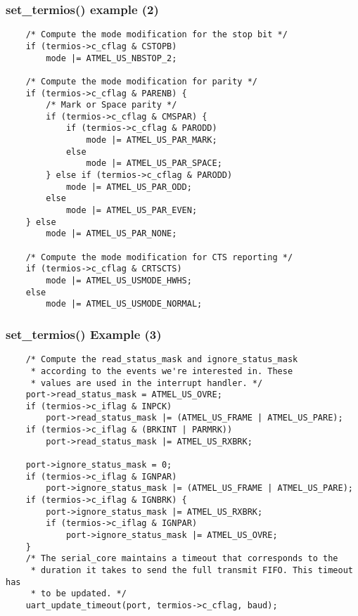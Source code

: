 \begin{frame}[fragile]
  \frametitle{set\_termios() example (2)}
\begin{verbatim}
    /* Compute the mode modification for the stop bit */
    if (termios->c_cflag & CSTOPB)
        mode |= ATMEL_US_NBSTOP_2;

    /* Compute the mode modification for parity */
    if (termios->c_cflag & PARENB) {
        /* Mark or Space parity */
        if (termios->c_cflag & CMSPAR) {
            if (termios->c_cflag & PARODD)
                mode |= ATMEL_US_PAR_MARK;
            else
                mode |= ATMEL_US_PAR_SPACE;
        } else if (termios->c_cflag & PARODD)
            mode |= ATMEL_US_PAR_ODD;
        else
            mode |= ATMEL_US_PAR_EVEN;
    } else
        mode |= ATMEL_US_PAR_NONE;

    /* Compute the mode modification for CTS reporting */
    if (termios->c_cflag & CRTSCTS)
        mode |= ATMEL_US_USMODE_HWHS;
    else
        mode |= ATMEL_US_USMODE_NORMAL;
\end{verbatim}
\end{frame}

\begin{frame}[fragile]
  \frametitle{set\_termios() Example (3)}
\begin{verbatim}
    /* Compute the read_status_mask and ignore_status_mask 
     * according to the events we're interested in. These
     * values are used in the interrupt handler. */
    port->read_status_mask = ATMEL_US_OVRE;
    if (termios->c_iflag & INPCK)
        port->read_status_mask |= (ATMEL_US_FRAME | ATMEL_US_PARE);
    if (termios->c_iflag & (BRKINT | PARMRK))
        port->read_status_mask |= ATMEL_US_RXBRK;

    port->ignore_status_mask = 0;
    if (termios->c_iflag & IGNPAR)
        port->ignore_status_mask |= (ATMEL_US_FRAME | ATMEL_US_PARE);
    if (termios->c_iflag & IGNBRK) {
        port->ignore_status_mask |= ATMEL_US_RXBRK;
        if (termios->c_iflag & IGNPAR)
            port->ignore_status_mask |= ATMEL_US_OVRE;
    }
    /* The serial_core maintains a timeout that corresponds to the
     * duration it takes to send the full transmit FIFO. This timeout has
     * to be updated. */
    uart_update_timeout(port, termios->c_cflag, baud);
\end{verbatim}
\end{frame}

